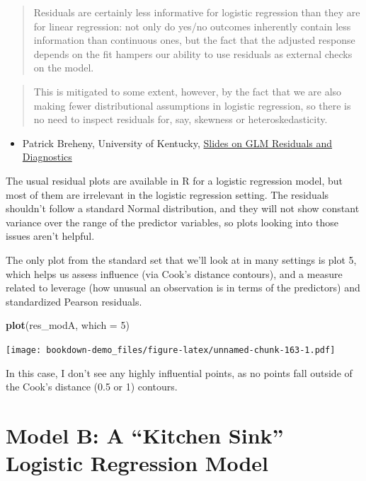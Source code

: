 \documentclass[]{book}
\newenvironment{Shaded}{\begin{snugshade}}{\end{snugshade}}
\newcommand{\KeywordTok}[1]{\textcolor[rgb]{0.13,0.29,0.53}{\textbf{#1}}}
\newcommand{\DataTypeTok}[1]{\textcolor[rgb]{0.13,0.29,0.53}{#1}}
\newcommand{\DecValTok}[1]{\textcolor[rgb]{0.00,0.00,0.81}{#1}}
\newcommand{\NormalTok}[1]{#1}
\providecommand{\tightlist}{%
  \setlength{\itemsep}{0pt}\setlength{\parskip}{0pt}}
\theoremstyle{definition}
\theoremstyle{definition}
\theoremstyle{definition}
\theoremstyle{remark}
\begin{document}
\begin{quote}
Residuals are certainly less informative for logistic regression than
they are for linear regression: not only do yes/no outcomes inherently
contain less information than continuous ones, but the fact that the
adjusted response depends on the fit hampers our ability to use
residuals as external checks on the model.
\end{quote}

\begin{quote}
This is mitigated to some extent, however, by the fact that we are also
making fewer distributional assumptions in logistic regression, so there
is no need to inspect residuals for, say, skewness or
heteroskedasticity.
\end{quote}

\begin{itemize}
\tightlist
\item
  Patrick Breheny, University of Kentucky,
  \href{https://web.as.uky.edu/statistics/users/pbreheny/760/S13/notes/3-26.pdf}{Slides
  on GLM Residuals and Diagnostics}
\end{itemize}

The usual residual plots are available in R for a logistic regression
model, but most of them are irrelevant in the logistic regression
setting. The residuals shouldn't follow a standard Normal distribution,
and they will not show constant variance over the range of the predictor
variables, so plots looking into those issues aren't helpful.

The only plot from the standard set that we'll look at in many settings
is plot 5, which helps us assess influence (via Cook's distance
contours), and a measure related to leverage (how unusual an observation
is in terms of the predictors) and standardized Pearson residuals.

\begin{Shaded}
\begin{Highlighting}[]
\KeywordTok{plot}\NormalTok{(res_modA, }\DataTypeTok{which =} \DecValTok{5}\NormalTok{)}
\end{Highlighting}
\end{Shaded}

\texttt{[image: bookdown-demo\_files/figure-latex/unnamed-chunk-163-1.pdf]}

In this case, I don't see any highly influential points, as no points
fall outside of the Cook's distance (0.5 or 1) contours.

\section{\texorpdfstring{Model B: A ``Kitchen Sink'' Logistic Regression
Model}{Model B: A Kitchen Sink Logistic Regression Model}}\label{model-b-a-kitchen-sink-logistic-regression-model}
\end{document}
